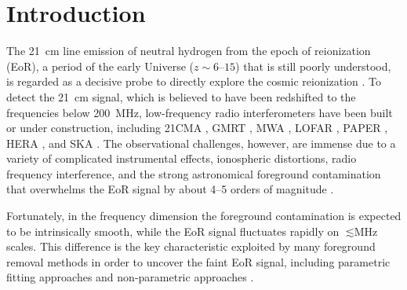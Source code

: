 \documentclass[letters,a4paper,fleqn,usenatbib]{mnras}
\begin{document}
\section{Introduction}
\label{sec:intro}

The \SI{21}{\cm} line emission of neutral hydrogen from the
epoch of reionization (EoR), a period of the early Universe
($z \sim \numrange{6}{15}$) that is still poorly understood, is regarded
as a decisive probe to directly explore the cosmic reionization
\citep[see][for reviews]{furlanetto2006rev,furlanetto2016rev}.
To detect the \SI{21}{\cm} signal, which is believed to have been
redshifted to the frequencies below \SI{200}{\MHz}, low-frequency
radio interferometers have been built or under construction, including
21CMA \citep{zheng2016}, GMRT \citep{paciga2011}, MWA \citep{tingay2013},
LOFAR \citep{vanHaarlem2013}, PAPER \citep{parsons2010},
HERA \citep{deboer2017}, and SKA \citep{koopmans2015rev}.
The observational challenges, however, are immense due to a variety of
complicated instrumental effects, ionospheric distortions, radio frequency
interference, and the strong astronomical foreground contamination that
overwhelms the EoR signal by about \numrange{4}{5} orders of magnitude
\citep[see][for a review]{morales2010rev}.

Fortunately, in the frequency dimension the foreground contamination
is expected to be intrinsically smooth, while the EoR signal fluctuates
rapidly on $\lesssim \si{\MHz}$ scales.
This difference is the key characteristic exploited by many
foreground removal methods in order to uncover the faint EoR signal,
including parametric fitting approaches
\citep[e.g.,][]{wang2006,liu2009fgrm,wang2013}
and non-parametric approaches
\citep[e.g.,][]{harker2009,chapman2013,mertens2018}.
\end{document}
